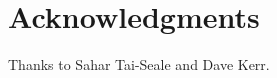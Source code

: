 \documentclass{aes137}
\begin{document}
\section{Acknowledgments}
Thanks to Sahar Tai-Seale and Dave Kerr.

%
%




%
%
\end{document}
